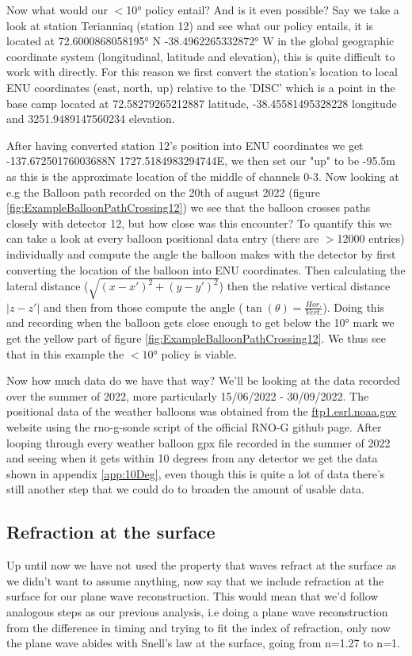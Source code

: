Now what would our $<$10° policy entail? And is it even possible?  Say we take
a look at station Terianniaq (station 12) and see what our policy entails,
it is located at 72.6000868058195° N -38.4962265332872° W in the global geographic
coordinate system (longitudinal, latitude and elevation), this is quite
difficult to work with directly. For this reason we first convert the station's location to 
local ENU coordinates (east, north, up) relative to the 'DISC' which is a point in the base camp located at
72.58279265212887 latitude, -38.45581495328228 longitude and 3251.9489147560234 elevation.  

After having converted station 12's position into ENU coordinates we get
-137.67250176003688N 1727.5184983294744E, we then set our "up" to be -95.5m as
this is the approximate location of the middle of channels 0-3.  Now looking at
e.g the Balloon path recorded on the 20th of august 2022 (figure
\ref{fig:ExampleBalloonPathCrossing12}) we see that the balloon crosses paths
closely with detector 12, but how close was this encounter? To quantify this we
can take a look at every balloon positional data entry (there are $>$12000
entries) individually and compute the angle the balloon makes with the detector
by first converting the location of the balloon into ENU coordinates. Then
calculating the lateral distance ($\sqrt{(x-x')^2 + (y-y')^2}$) then the
relative vertical distance $|z - z'|$ and then from those compute the angle
($\tan(\theta) = \frac{Hor.}{Vert.}$). Doing this and recording when the balloon
gets close enough to get below the 10° mark we get the yellow part of figure
\ref{fig:ExampleBalloonPathCrossing12}. We thus see that in this
example the $<10$° policy is viable.

Now how much data do we have that way? 
We'll be looking at the data recorded over the summer of
2022, more particularly 15/06/2022 - 30/09/2022.
The positional data of the weather balloons was obtained from the
\url{ftp1.esrl.noaa.gov} website using the rno-g-sonde script of the official
RNO-G github page. After looping through every weather
balloon gpx file recorded in the summer of 2022 and seeing when it gets
within 10 degrees from any detector we get the data shown in appendix \ref{app:10Deg}, even
though this is quite a lot of data there's still another step that we could do
to broaden the amount of usable data.
\subsection{Refraction at the surface}
Up until now we have not used the property that waves refract at the surface as
we didn't want to assume anything, now say that we include refraction at the
surface for our plane wave reconstruction. This would mean that we'd follow
analogous steps as our previous analysis, i.e doing a plane wave reconstruction
from the difference in timing and trying to fit the index of refraction, only
now the plane wave abides with Snell's law at the surface, going from n=1.27 to
n=1. 

